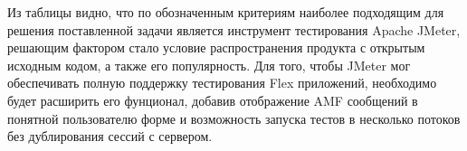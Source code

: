 Из таблицы видно, что по обозначенным критериям наиболее подходящим для 
решения поставленной задачи является инструмент тестирования Apache JMeter, решающим
фактором стало условие распространения продукта с открытым исходным кодом, а также его популярность.
Для того, чтобы JMeter мог обеспечивать полную поддержку тестирования Flex приложений, необходимо
будет расширить его фунционал, добавив отображение AMF сообщений в понятной пользователю 
форме и возможность запуска тестов в несколько потоков без дублирования сессий с сервером.